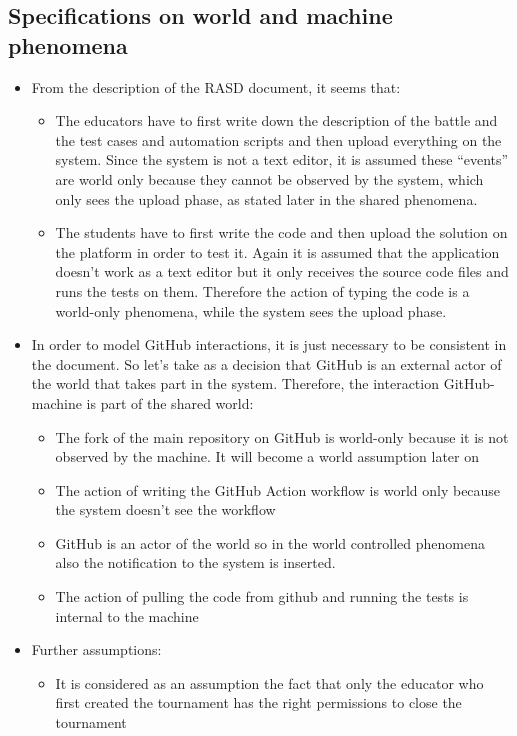 	\subsection{Specifications on world and machine phenomena}
	\begin{itemize}
		\item From the description of the RASD document, it seems that:
		\begin{itemize}
			\item The educators have to first write down the description of the battle and the test cases and automation scripts and then upload everything on the system. Since the system is not a text editor, it is assumed these “events” are world only because they cannot be observed by the system, which only sees the upload phase, as stated later in the shared phenomena.
			\item The students have to first write the code and then upload the solution on the platform in order to test it. Again it is assumed that the application doesn’t work as a text editor but it only receives the source code files and runs the tests on them. Therefore the action of typing the code is a world-only phenomena, while the system sees the upload phase.
		\end{itemize} 
		\item In order to model GitHub interactions, it is just necessary to be consistent in the document. So let’s take as a decision that GitHub is an external actor of the world that takes part in the system. Therefore, the interaction GitHub-machine is part of the shared world:
		\begin{itemize}
			\item The fork of the main repository on GitHub is world-only because it is not observed by the machine. It will become a world assumption later on
			\item The action of writing the GitHub Action workflow is world only because the system doesn’t see the workflow
			\item GitHub is an actor of the world so in the world controlled phenomena also the notification to the system is inserted.
			\item The action of pulling the code from github and running the tests is internal to the machine
		\end{itemize}
		\item Further assumptions:
		\begin{itemize}
			\item It is considered as an assumption the fact that only the educator who first created the tournament has the right permissions to close the tournament
		\end{itemize}
		
	\end{itemize}
	
